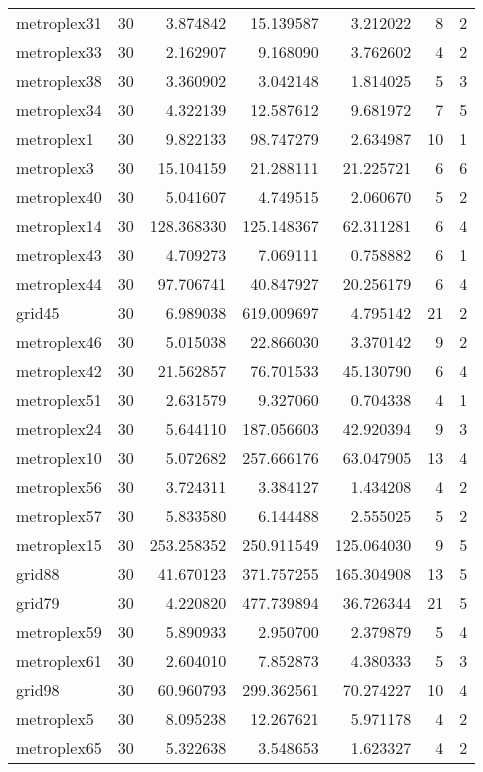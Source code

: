 \begin{longtable}{|l|r|r|r|r|r|r|}
metroplex31 & 30 & 3.874842 & 15.139587 & 3.212022 & 8 & 2 \\
metroplex33 & 30 & 2.162907 & 9.168090 & 3.762602 & 4 & 2 \\
metroplex38 & 30 & 3.360902 & 3.042148 & 1.814025 & 5 & 3 \\
metroplex34 & 30 & 4.322139 & 12.587612 & 9.681972 & 7 & 5 \\
metroplex1 & 30 & 9.822133 & 98.747279 & 2.634987 & 10 & 1 \\
metroplex3 & 30 & 15.104159 & 21.288111 & 21.225721 & 6 & 6 \\
metroplex40 & 30 & 5.041607 & 4.749515 & 2.060670 & 5 & 2 \\
metroplex14 & 30 & 128.368330 & 125.148367 & 62.311281 & 6 & 4 \\
metroplex43 & 30 & 4.709273 & 7.069111 & 0.758882 & 6 & 1 \\
metroplex44 & 30 & 97.706741 & 40.847927 & 20.256179 & 6 & 4 \\
grid45 & 30 & 6.989038 & 619.009697 & 4.795142 & 21 & 2 \\
metroplex46 & 30 & 5.015038 & 22.866030 & 3.370142 & 9 & 2 \\
metroplex42 & 30 & 21.562857 & 76.701533 & 45.130790 & 6 & 4 \\
metroplex51 & 30 & 2.631579 & 9.327060 & 0.704338 & 4 & 1 \\
metroplex24 & 30 & 5.644110 & 187.056603 & 42.920394 & 9 & 3 \\
metroplex10 & 30 & 5.072682 & 257.666176 & 63.047905 & 13 & 4 \\
metroplex56 & 30 & 3.724311 & 3.384127 & 1.434208 & 4 & 2 \\
metroplex57 & 30 & 5.833580 & 6.144488 & 2.555025 & 5 & 2 \\
metroplex15 & 30 & 253.258352 & 250.911549 & 125.064030 & 9 & 5 \\
grid88 & 30 & 41.670123 & 371.757255 & 165.304908 & 13 & 5 \\
grid79 & 30 & 4.220820 & 477.739894 & 36.726344 & 21 & 5 \\
metroplex59 & 30 & 5.890933 & 2.950700 & 2.379879 & 5 & 4 \\
metroplex61 & 30 & 2.604010 & 7.852873 & 4.380333 & 5 & 3 \\
grid98 & 30 & 60.960793 & 299.362561 & 70.274227 & 10 & 4 \\
metroplex5 & 30 & 8.095238 & 12.267621 & 5.971178 & 4 & 2 \\
metroplex65 & 30 & 5.322638 & 3.548653 & 1.623327 & 4 & 2 \\

\end{longtable}
